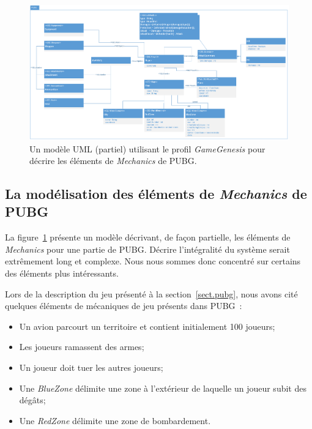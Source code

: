 \begin{landscape}
\begin{figure}
    \centering
    \includegraphics[width=\linewidth]{10_img/chap6/final_model.PNG}
    \caption{Un modèle UML (partiel) utilisant le profil \emph{GameGenesis} pour d\'ecrire les \'el\'ements de \emph{Mechanics} de PUBG.}
    \label{fig.PUBG_model}
\end{figure}
\end{landscape}



\subsection{La modélisation des \'el\'ements de \emph{Mechanics} de PUBG}

La figure~\ref{fig.PUBG_model} présente un mod\`ele d\'ecrivant, de
fa\c{c}on partielle, les \'el\'ements de \emph{Mechanics} pour une
partie de PUBG.
%
 Décrire l'intégralité du système serait extrêmement long et complexe. Nous nous sommes donc concentré sur certains des \'el\'ements plus int\'eressants.


Lors de la description du jeu présenté à la section~\ref{sect.pubg}, nous avons cité quelques éléments de mécaniques de jeu présents dans PUBG~: 
\begin{itemize}
    \item Un avion parcourt un territoire et contient initialement 100 joueurs;
    \item Les joueurs ramassent des armes;
    \item Un joueur doit tuer les autres joueurs;
    \item Une \emph{BlueZone} délimite une zone à l'extérieur de laquelle un joueur subit des dégâts;
    \item Une \emph{RedZone} délimite une zone de bombardement.
\end{itemize}

